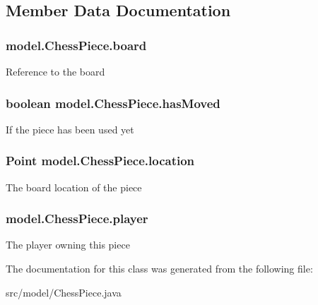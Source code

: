 \subsection{Member Data Documentation}
\hypertarget{classmodel_1_1_chess_piece_a41b428c5909b4d5bf0dab321be4cfa56}{
\subsubsection[{board}]{ model.\-Chess\-Piece.\-board\hspace{0.3cm}{\ttfamily [protected]}}}\label{classmodel_1_1_chess_piece_a41b428c5909b4d5bf0dab321be4cfa56}
Reference to the board \hypertarget{classmodel_1_1_chess_piece_ab3cb2b4640d680527a76ee105d233107}{
\subsubsection[{has\-Moved}]{\setlength{\rightskip}{0pt plus 5cm}boolean model.\-Chess\-Piece.\-has\-Moved\hspace{0.3cm}{\ttfamily [protected]}}}\label{classmodel_1_1_chess_piece_ab3cb2b4640d680527a76ee105d233107}
If the piece has been used yet \hypertarget{classmodel_1_1_chess_piece_a7fc68849278fd30e4c238e8e40d6be8b}{
\subsubsection[{location}]{\setlength{\rightskip}{0pt plus 5cm}Point model.\-Chess\-Piece.\-location\hspace{0.3cm}{\ttfamily [protected]}}}\label{classmodel_1_1_chess_piece_a7fc68849278fd30e4c238e8e40d6be8b}
The board location of the piece \hypertarget{classmodel_1_1_chess_piece_a7c821434522ec5b3f84549ab7b49614f}{
\subsubsection[{player}]{ model.\-Chess\-Piece.\-player\hspace{0.3cm}{\ttfamily [protected]}}}\label{classmodel_1_1_chess_piece_a7c821434522ec5b3f84549ab7b49614f}
The player owning this piece 

The documentation for this class was generated from the following file\-:\begin{DoxyCompactItemize}
\item 
src/model/Chess\-Piece.\-java\end{DoxyCompactItemize}
